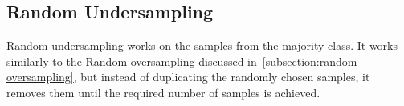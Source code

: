 \subsection{Random Undersampling}
\label{subsection:random-undersampling}

Random undersampling works on the samples from the majority class. It works similarly to the Random
oversampling discussed in~\ref{subsection:random-oversampling}, but instead of duplicating the
randomly chosen samples, it removes them until the required number of samples is achieved.
